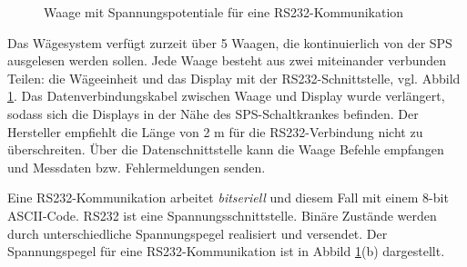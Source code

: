 \begin{figure}[htb]
\centering
{}
\hspace{2cm}
\caption{Waage mit Spannungspotentiale für eine RS232-Kommunikation}
\label{fig:Waage}
\end{figure}


Das Wägesystem verfügt zurzeit über 5 Waagen, die kontinuierlich von der SPS ausgelesen werden sollen. Jede Waage besteht aus zwei miteinander verbunden Teilen: die Wägeeinheit und das Display mit der RS232-Schnittstelle, vgl. Abbild \ref{fig:Waage}. Das Datenverbindungskabel zwischen Waage und Display wurde verlängert, sodass sich die Displays in der Nähe des SPS-Schaltkrankes befinden. Der Hersteller empfiehlt die Länge von 2 m für die RS232-Verbindung nicht zu überschreiten.  
Über die Datenschnittstelle kann die Waage Befehle empfangen und Messdaten bzw. Fehlermeldungen senden. 

Eine RS232-Kommunikation arbeitet \textit{bitseriell} und diesem Fall mit einem 8-bit ASCII-Code. RS232 ist eine Spannungsschnittstelle. Binäre Zustände werden durch unterschiedliche Spannungspegel realisiert und versendet. Der Spannungspegel für eine RS232-Kommunikation ist in Abbild \ref{fig:Waage}(b) dargestellt. \citep{Schleicher2005}

